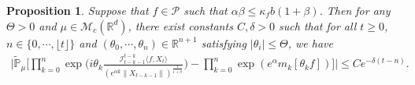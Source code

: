 \documentclass[12pt,a4paper]{amsart}
\theoremstyle{plain}
\newtheorem{prop}[thm]{Proposition}
\theoremstyle{definition}
\numberwithin{equation}{section}
\begin{document}
\begin{prop}\label{corollary31}
Suppose that $f\in \mathcal{P}$ such that $\alpha\beta\leq\kappa_fb(1+\beta)$. Then for any $\Theta >0$ and $\mu\in \mathcal M_c(\mathbb R^d)$,
there exist constants $C,\delta>0$ such that
for all $t\geq 0$,
$n \in \{0, \cdots, \lfloor t \rfloor\}$ and $(\theta_0, \cdots, \theta_n)\in \mathbb R^{n+1}$
satisfying $|\theta_i|\leq \Theta$, we have
\begin{equation}\begin{split}
\label{32corollary}
    \Big|\mathbb{\tilde{P}}_{\mu}\Big[\prod_{k=0}^n\exp\Big(i\theta_k \frac {\mathcal I_{t-k-1}^{t-k}\langle f ,X_t\rangle}{(e^{\alpha k}\|X_{t-k-1}\|)^\frac{1}{1+\beta}}\Big)-\prod_{k=0}^n\exp(e^{\alpha}m_k[\theta_k f])\Big]\Big|\leq C e^{-\delta(t-n)}.
\end{split}\end{equation}
\end{prop}
\end{document}
